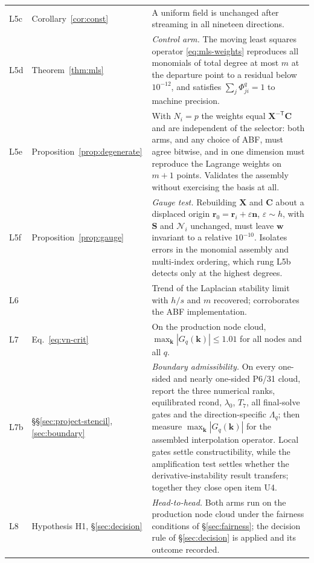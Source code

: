 \documentclass[11pt,a4paper]{article}
\renewcommand{\arraystretch}{1.2}
\newenvironment{widetable}
  {\begingroup\small\setlength{\tabcolsep}{4pt}%
   \renewcommand{\arraystretch}{1.15}%
   \setlength{\LTpre}{0.8em}\setlength{\LTpost}{0.8em}}
  {\endgroup}
\begin{document}
\begin{widetable}
\begin{longtable}{@{}P{1.05cm}P{3.3cm}P{11.35cm}@{}}
L5c & Corollary~\ref{cor:const} & A uniform field is unchanged after streaming in all
nineteen directions. \\
L5d & Theorem~\ref{thm:mls} & \emph{Control arm.} The moving least squares operator
\eqref{eq:mls-weights} reproduces all monomials of total degree at most $m$ at the
departure point to a residual below $10^{-12}$, and satisfies
$\sum_j\Phi^{q}_{ji}=1$ to machine precision. \\
L5e & Proposition~\ref{prop:degenerate} & With $N_i=p$ the weights equal
$\bm X^{-\mathsf T}\bm C$ and are independent of the selector: both arms, and any
choice of ABF, must agree bitwise, and in one dimension must reproduce the Lagrange
weights on $m+1$ points. Validates the assembly without exercising the basis at all. \\
L5f & Proposition~\ref{prop:gauge} & \emph{Gauge test.} Rebuilding $\bm X$ and $\bm C$
about a displaced origin $\bm r_0=\bm r_i+\varepsilon\bm n$, $\varepsilon\sim h$,
with $\bm S$ and $\mathcal N_i$ unchanged, must leave $\bm w$ invariant to a relative
$10^{-10}$. Isolates errors in the monomial assembly and multi-index ordering, which
rung L5b detects only at the highest degrees. \\
L6 & \cite[\S 4.2, Table 1]{KLN2020} & Trend of the Laplacian stability limit with $h/s$ and
$m$ recovered; corroborates the ABF implementation. \\
L7 & Eq.~\eqref{eq:vn-crit} & On the production node cloud,
$\max_{\bm k}|G_q(\bm k)|\le1.01$ for all nodes and all $q$. \\
L7b & \S\S\ref{sec:project-stencil}, \ref{sec:boundary} &
\emph{Boundary admissibility.} On every one-sided and nearly one-sided P6/31 cloud,
report the three numerical ranks, equilibrated rcond, $\lambda_0$, $T_7$, all final-solve
gates and the direction-specific $\Lambda_q$; then measure
$\max_{\bm k}|G_q(\bm k)|$ for the assembled interpolation operator. Local gates settle
constructibility, while the amplification test settles whether the derivative-instability
result transfers; together they close open item U4. \\
L8 & Hypothesis H1, \S\ref{sec:decision} & \emph{Head-to-head.} Both arms run on the
production node cloud under the fairness conditions of \S\ref{sec:fairness}; the
decision rule of \S\ref{sec:decision} is applied and its outcome recorded. \\
\end{longtable}
\end{widetable}
\end{document}
